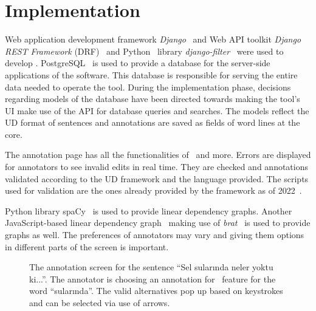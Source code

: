 \section{Implementation}
\label{sec:implementation}

Web application development framework \textit{Django}~\cite{django} and Web API toolkit \textit{Django REST Framework} (DRF)~\cite{drf} and Python~\cite{python} library \textit{django-filter}~\cite{django-filter} were used to develop \boatvtwo.
PostgreSQL~\cite{psql} is used to provide a database for the server-side applications of the software.
This database is responsible for serving the entire data needed to operate the tool.
During the implementation phase, decisions regarding models of the database have been directed towards making the tool's UI make use of the API for database queries and searches.
The models reflect the UD format of sentences and annotations are saved as fields of word lines at the core.

The annotation page has all the functionalities of \boatvone\ and more.
Errors are displayed for annotators to see invalid edits in real time.
They are checked and annotations validated according to the UD framework and the language provided.
The scripts used for validation are the ones already provided by the framework as of 2022~\cite{UD-git}.

Python library spa\textsc{C}y~\cite{spacy} is used to provide linear dependency graphs.
Another JavaScript-based linear dependency graph~\cite{spyssalo} making use of \textit{brat}~\cite{brat-vis} is used to provide graphs as well.
The preferences of annotators may vary and giving them options in different parts of the screen is important.

\begin{figure}[tbh]
    \centering
    \caption{The annotation screen for the sentence ``Sel sularında neler yoktu ki...''. The annotator is choosing an annotation for \deprel\ feature for the word ``sularında''. The valid alternatives pop up based on keystrokes and can be selected via use of arrows. }
    \label{fig:demo-fig}
\end{figure}

